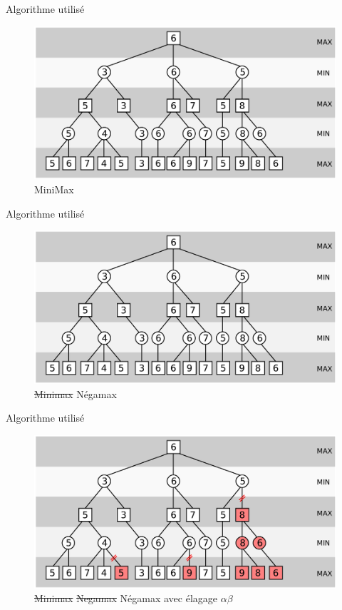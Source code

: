 \documentclass[compress, 12pt]{beamer}
\begin{document}
\begin{frame}{Algorithme utilisé}
  \begin{figure}
    \includegraphics[width=\textwidth]{pix/minimax}
    \centering
    \caption{MiniMax}
  \end{figure}
\end{frame}

\begin{frame}{Algorithme utilisé}
  \begin{figure}
    \includegraphics[width=\textwidth]{pix/minimax}
    \centering
    \caption{\st{Minimax} Négamax}
  \end{figure}
\end{frame}

\begin{frame}{Algorithme utilisé}
  \begin{figure}
    \includegraphics[height=0.6\textheight]{pix/alphabeta}
    \centering
    \caption{
        \st{Minimax}
        \st{Negamax}
        Négamax avec élagage $\alpha\beta$}
  \end{figure}
\end{frame}
\end{document}
